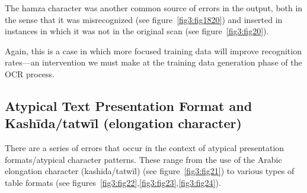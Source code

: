 The hamza character was another common source of errors in the output, both in
the sense that it was misrecognized (see figure~\ref{fig3:fig1820}) and inserted
in instances in which it was not in the original scan (see
figure~\ref{fig3:fig20}). 

Again, this is a case in which more focused training data will improve
recognition rates—an intervention we must make at the training data generation
phase of the OCR process.  

\subsection{Atypical Text Presentation Format and Kashīda/tatwīl (elongation character)}

There are a series of errors that occur in the context of atypical presentation
formats/atypical character patterns. These range from the use of the Arabic
elongation character (kashīda/tatwīl) (see figure~\ref{fig3:fig21}) to various types of table
formats (see figures~\ref{fig3:fig22},\ref{fig3:fig23},\ref{fig3:fig24}).

